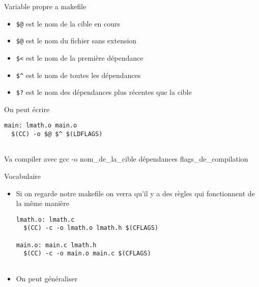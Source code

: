 \begin{frame}[containsverbatim]{\ftitle}
\def\blocktitle{Variable propre a makefile}
\begin{block}{\blocktitle}
\begin{itemize}
\item \verb!$@! est le nom de la cible en cours
\item \verb!$@! est le nom du fichier sans extension
\item \verb!$<! est le nom de la première dépendance
\item \verb!$^! est le nom de toutes les dépendances
\item \verb!$?! est le nom des dépendances plus récentes que la cible
\end{itemize}%
\end{block}
\end{frame}


\def\blocktitle{On peut écrire}
\begin{block}{\blocktitle}
\begin{verbatim}
main: lmath.o main.o
  $(CC) -o $@ $^ $(LDFLAGS)
  
\end{verbatim}%
Va compiler avec gcc -o nom\_de\_la\_cible dépendances flags\_de\_compilation
\end{block}


\begin{frame}[containsverbatim]{\ftitle}
\def\blocktitle{Vocabulaire}
\begin{block}{\blocktitle}
\begin{itemize}
\item Si on regarde notre makefile on verra qu'il y a des règles qui fonctionnent de la même manière
\begin{verbatim}
lmath.o: lmath.c
  $(CC) -c -o lmath.o lmath.h $(CFLAGS)
  
main.o: main.c lmath.h
  $(CC) -c -o main.o main.c $(CFLAGS)
  
\end{verbatim}
\item On peut généraliser
\end{itemize}
\end{block}
\end{frame}


